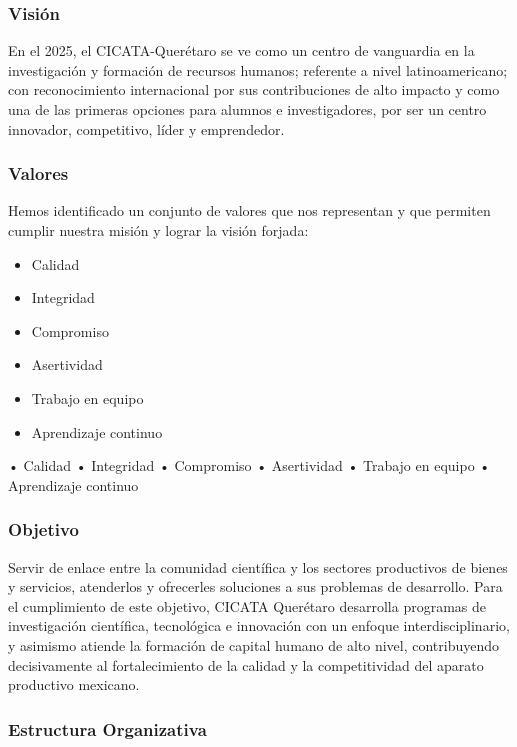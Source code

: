 \documentclass[12pt]{book} %
\begin{document}
		\subsubsection{Visión}
			En el 2025, el CICATA-Querétaro se ve como un centro de vanguardia en la investigación y formación de 
			recursos humanos; referente a nivel latinoamericano; con reconocimiento internacional por sus contribuciones
			de alto impacto y como una de las primeras opciones para alumnos e investigadores, por ser un centro
			innovador, competitivo, líder y emprendedor.
		
		\subsubsection{Valores}
			Hemos identificado un conjunto de valores que nos representan y que permiten cumplir nuestra misión y lograr
			la visión forjada:
			
			\begin{itemize}
				\item Calidad
				\item Integridad
				\item Compromiso
				\item Asertividad
				\item Trabajo en equipo
				\item Aprendizaje continuo
			\end{itemize}
	
			• Calidad
			• Integridad
			• Compromiso
			• Asertividad
			• Trabajo en equipo
			• Aprendizaje continuo
		
		\subsubsection{Objetivo}
			Servir de enlace entre la comunidad científica y los sectores productivos de bienes y servicios, atenderlos
			y ofrecerles soluciones a sus problemas de desarrollo. Para el cumplimiento de este objetivo, CICATA
			Querétaro desarrolla programas de investigación científica, tecnológica e innovación con un enfoque
			interdisciplinario, y asimismo atiende la formación de capital humano de alto nivel, contribuyendo
 			decisivamente al fortalecimiento de la calidad y la competitividad del aparato productivo mexicano.
 		
 		\subsubsection{Estructura Organizativa}
			 
\end{document}
